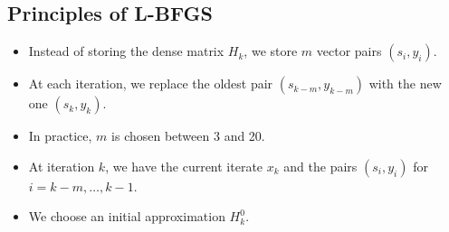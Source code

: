 \subsection{Principles of L-BFGS}

\begin{itemize}
    \item Instead of storing the dense matrix $H_k$, we store $m$ vector pairs $(s_i, y_i)$.
    \item At each iteration, we replace the oldest pair $(s_{k-m}, y_{k-m})$ with the new one $(s_k, y_k)$.
    \item In practice, $m$ is chosen between 3 and 20.
    \item At iteration $k$, we have the current iterate $x_k$ and the pairs $(s_i, y_i)$ for $i = k-m, \dots, k-1$.
    \item We choose an initial approximation $H_k^0$.
\end{itemize}

